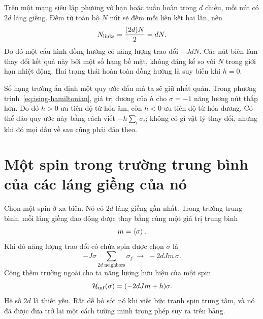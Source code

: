 Trên một mạng siêu lập phương vô hạn hoặc tuần hoàn trong \(d\) chiều, mỗi nút có \(2d\) láng giềng. Đếm từ toàn bộ \(N\) nút sẽ đếm mỗi liên kết hai lần, nên
\begin{equation}
N_{\rm links}=\frac{(2d)N}{2}=dN.
\label{eq:number-links}
\end{equation}
Do đó một cấu hình đồng hướng có năng lượng trao đổi \(-JdN\). Các nút biên làm thay đổi kết quả này bởi một số hạng bề mặt, không đáng kể so với \(N\) trong giới hạn nhiệt động. Hai trạng thái hoàn toàn đồng hướng là suy biến khi \(h=0\).

Số hạng trường ấn định một quy ước dấu mà ta sẽ giữ nhất quán. Trong phương trình~\eqref{eq:ising-hamiltonian}, giá trị dương của \(h\) cho \(\sigma=-1\) năng lượng nút thấp hơn. Do đó \(h>0\) ưu tiên độ từ hóa âm, còn \(h<0\) ưu tiên độ từ hóa dương. Có thể đảo quy ước này bằng cách viết \(-h\sum_i\sigma_i\); không có gì vật lý thay đổi, nhưng khi đó mọi dấu về sau cũng phải đảo theo.

\begin{classroomqa}
\end{classroomqa}

\section{Một spin trong trường trung bình của các láng giềng của nó}

Chọn một spin ở xa biên. Nó có \(2d\) láng giềng gần nhất. Trong trường trung bình, mỗi láng giềng dao động được thay bằng cùng một giá trị trung bình
\begin{equation}
m=\left\langle\sigma\right\rangle.
\end{equation}
Khi đó năng lượng trao đổi có chứa spin được chọn \(\sigma\) là
\begin{equation}
-J\sigma\sum_{\text{\(2d\) neighbors}}\sigma_j
\;\longrightarrow\;-2dJm\,\sigma.
\end{equation}
Cộng thêm trường ngoài cho ta năng lượng hữu hiệu của một spin
\begin{equation}
\mathcal H_{\rm mf}(\sigma)=(-2dJm+h)\sigma.
\label{eq:mean-field-one-spin}
\end{equation}
Hệ số \(2d\) là thiết yếu. Rất dễ bỏ sót nó khi viết bức tranh spin trung tâm, và nó đã được đưa trở lại một cách tường minh trong phép suy ra trên bảng.

